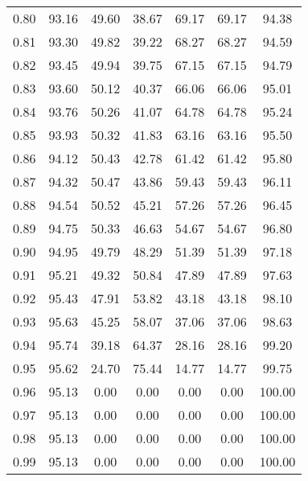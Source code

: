 \begin{tabular}{|c|c|c|c|c|c|c|}
      0.80 &     93.16 &     49.60 &      38.67 &   69.17 &      69.17 &         94.38 \\
      0.81 &     93.30 &     49.82 &      39.22 &   68.27 &      68.27 &         94.59 \\
      0.82 &     93.45 &     49.94 &      39.75 &   67.15 &      67.15 &         94.79 \\
      0.83 &     93.60 &     50.12 &      40.37 &   66.06 &      66.06 &         95.01 \\
      0.84 &     93.76 &     50.26 &      41.07 &   64.78 &      64.78 &         95.24 \\
      0.85 &     93.93 &     50.32 &      41.83 &   63.16 &      63.16 &         95.50 \\
      0.86 &     94.12 &     50.43 &      42.78 &   61.42 &      61.42 &         95.80 \\
      0.87 &     94.32 &     50.47 &      43.86 &   59.43 &      59.43 &         96.11 \\
      0.88 &     94.54 &     50.52 &      45.21 &   57.26 &      57.26 &         96.45 \\
      0.89 &     94.75 &     50.33 &      46.63 &   54.67 &      54.67 &         96.80 \\
      0.90 &     94.95 &     49.79 &      48.29 &   51.39 &      51.39 &         97.18 \\
      0.91 &     95.21 &     49.32 &      50.84 &   47.89 &      47.89 &         97.63 \\
      0.92 &     95.43 &     47.91 &      53.82 &   43.18 &      43.18 &         98.10 \\
      0.93 &     95.63 &     45.25 &      58.07 &   37.06 &      37.06 &         98.63 \\
      0.94 &     95.74 &     39.18 &      64.37 &   28.16 &      28.16 &         99.20 \\
      0.95 &     95.62 &     24.70 &      75.44 &   14.77 &      14.77 &         99.75 \\
      0.96 &     95.13 &      0.00 &       0.00 &    0.00 &       0.00 &        100.00 \\
      0.97 &     95.13 &      0.00 &       0.00 &    0.00 &       0.00 &        100.00 \\
      0.98 &     95.13 &      0.00 &       0.00 &    0.00 &       0.00 &        100.00 \\
      0.99 &     95.13 &      0.00 &       0.00 &    0.00 &       0.00 &        100.00 \\
\bottomrule
\end{tabular}
